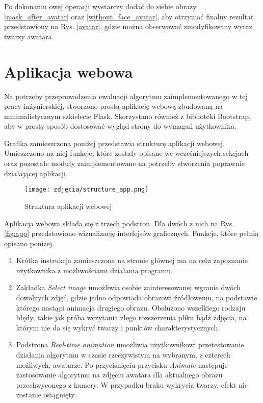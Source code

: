 Po dokonaniu owej operacji wystarczy dodać do siebie obrazy \ref{mask_after_avatar} oraz \ref{without_face_avatar}, aby otrzymać finalny rezultat przedstawiony na Rys. \ref{avatar}, gdzie można obserwować zmodyfikowany wyraz twarzy awatara.



\section{Aplikacja webowa}
Na potrzeby przeprowadzenia ewaluacji algorytmu zaimplementowanego w tej pracy inżynierskiej, stworzono prostą aplikację webową zbudowaną na minimalistycznym szkielecie Flask. Skorzystano również z biblioteki Bootstrap, aby w prosty sposób dostosować wygląd strony do wymagań użytkownika.

Grafika zamieszczona poniżej przedstawia strukturę aplikacji webowej. Umieszczono na niej funkcje, które zostały opisane we wcześniejszych sekcjach oraz pozostałe moduły zaimplementowane na potrzeby stworzenia poprawnie działającej aplikacji.

\begin{figure}[h]
	\centering
	\texttt{[image: zdjęcia/structure\_app.png]}
	\caption{Struktura aplikacji webowej} 
	\label{fig:structureApp}
\end{figure}

Aplikacja webowa składa się z trzech podstron. Dla dwóch z nich na Rys. \ref{fig:app} przedstawiono wizualizację interfejsów graficznych. Funkcje, które pełnią opisano poniżej.

\begin{enumerate}
    \item Krótka instrukcja zamieszczona na stronie głównej ma na celu zapoznanie użytkownika z możliwościami działania programu.
    \item Zakładka \textit{Select image} umożliwia osobie zainteresowanej wgranie dwóch dowolnych zdjęć, gdzie jedno odpowiada obrazowi źródłowemu, na podstawie którego nastąpi animacja drugiego obrazu. Obsłużono wszelkiego rodzaju błędy, takie jak próba wczytania złego rozszerzenia pliku bądź zdjęcia, na którym nie da się wykryć twarzy i punktów charakterystycznych.
    \item Podstrona \textit{Real-time animation} umożliwia użytkownikowi przetestowanie działania algorytmu w czasie rzeczywistym na wybranym, z czterech możliwych, awatarze. Po przyciśnięciu przycisku \textit{Animate} następuje zastosowanie algorytmu na zdjęciu awatara dla aktualnego obrazu przechwyconego z kamery. W przypadku braku wykrycia twarzy, efekt nie zostanie osiągnięty.
\end{enumerate}

